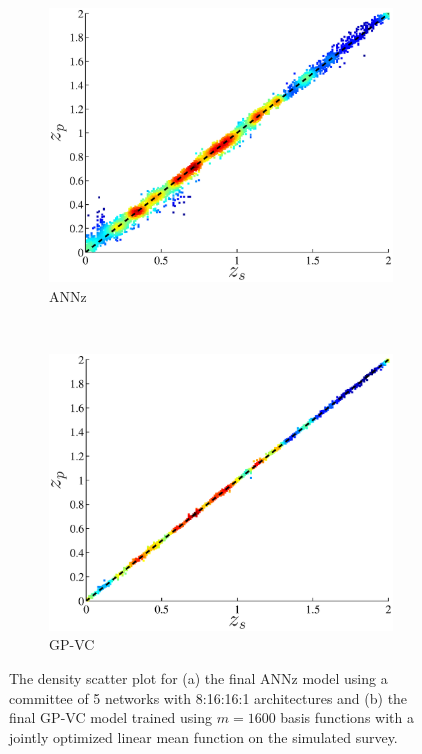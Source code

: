 \documentclass[useAMS,usenatbib,fleqn]{mn2e}
\begin{document}
\begin{figure}
        \centering
       
       \begin{subfigure}[b]{\columnwidth}
                \includegraphics[width=\columnwidth]{figures/ANN_final_euclid.eps}
        \caption{{\sc ANNz}}
        \end{subfigure}
        ~ 
        \begin{subfigure}[b]{\columnwidth}
                \includegraphics[width=\columnwidth]{figures/GPVC_final_euclid.eps}
        \caption{GP-VC}
        \end{subfigure}

       \caption{The density scatter plot for (a) the final {\sc ANNz} model using a committee of 5 networks with 8:16:16:1 architectures and (b) the final GP-VC model trained using $m=1600$ basis functions with a jointly optimized linear mean function on the simulated survey. }
       \label{fig-final-model}
\end{figure}
\end{document}
